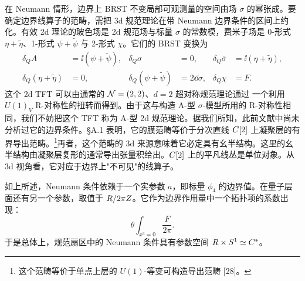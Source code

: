 
在 Neumann 情形，边界上 BRST 不变局部可观测量的空间由场 $\sigma$ 的幂张成。要确定边界线算子的范畴，需把 3d 规范理论在带 Neumann 边界条件的区间上约化。有效 2d 理论的玻色场是 2d 规范场与标量 $\sigma$ 的常数模，费米子场是 0-形式 $\eta+\tilde\eta$、1-形式 $\psi+\tilde\psi$ 与 2-形式 $\chi$。它们的 BRST 变换为
\[
\begin{aligned}
\delta_QA&=\ii(\psi+\tilde\psi), &
\delta_Q\sigma&=0, &
\delta_Q\bar\sigma&=\ii(\eta+\tilde\eta),\\
\delta_Q(\eta+\tilde\eta)&=0, &
\delta_Q(\psi+\tilde\psi)&=2\dd\sigma, &
\delta_Q\chi&=F .
\end{aligned}
\]
这个 2d TFT 可以由通常的 $\mathcal{N}=(2,2)$、$d=2$ 超对称规范理论通过
一个利用 $U(1)_V$ R-对称性的扭转而得到。由于这与构造 A-型 $\sigma$-模型所用的 R-对称性相同，我们不妨把这个 TFT 称为 A-型 2d 规范理论。据我们所知，此前文献中尚未分析过它的边界条件。§A.1 表明，它的膜范畴等价于分次直线 $C[2]$ 上凝聚层的有界导出范畴。\footnote{这个范畴等价于单点上层的 $U(1)$-等变可构造导出范畴 [28]。}再者，这个范畴的 3d 来源意味着它必定具有幺半结构。这里的幺半结构由凝聚层复形的通常导出张量积给出。$C[2]$ 上的平凡线丛是单位对象。从 3d 视角看，它对应于边界上"不可见"的线算子。




如上所述，Neumann 条件依赖于一个实参数 $a$，即标量 $\phi_4$ 的边界值。在量子层面还有另一个参数，取值于 $R/2\pi Z$。它作为边界作用量中一个拓扑项的系数出现：
\[
\theta\int_{x^3=0}\frac{F}{2\pi}.
\]
于是总体上，规范扇区中的 Neumann 条件具有参数空间 $R\times S^1\simeq C^*$。

